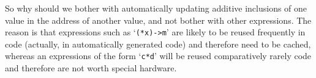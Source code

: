 \documentclass[12pt]{article}
\begin{document}
So why should we bother with automatically updating
additive inclusions of one value in the
address of another value, and not bother with other expressions.
The reason is that expressions such as
`\verb|(*x)->m|' are likely to be reused frequently in code (actually,
in automatically generated code) and
therefore need to be cached, whereas an expressions of the form
`\verb|c*d|' will be reused comparatively rarely code
and therefore are not worth special hardware.





\printindex
\end{document}
